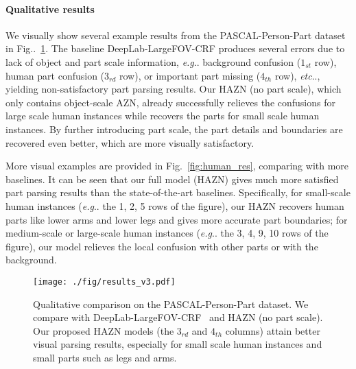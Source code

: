 \documentclass[runningheads]{llncs}
\makeatletter
\newcommand{\figref}[1]{Fig\onedot~\ref{#1}}
\DeclareRobustCommand\onedot{\futurelet\@let@token\@onedot}
\def\@onedot{\ifx\@let@token.\else.\null\fi\xspace}
\def\eg{\emph{e.g}\onedot} \def\Eg{\emph{E.g}\onedot}
\def\etc{\emph{etc}\onedot} \def\vs{\emph{vs}\onedot}
\makeatother
\begin{document}
\begin{table}[!b]
\centering
  \setlength{\tabcolsep}{10pt}
  \caption{Instance-wise part parsing accuracy on PASCAL-Person-Part in terms of $AP^r_{part}$.}
 \vspace{-1.\baselineskip}
  \label{table:apr_part}
\end{table}  

\paragraph{Qualitative results} We visually show several example results from the PASCAL-Person-Part dataset in \figref{fig:seg_image}. The baseline DeepLab-LargeFOV-CRF produces several errors due to lack of object and part scale information, \eg background confusion ($1_{st}$ row), human part confusion ($3_{rd}$ row), or important part missing ($4_{th}$ row), \etc, yielding non-satisfactory part parsing results. Our HAZN (no part scale), which only contains object-scale AZN, already successfully relieves the confusions for large scale human instances while recovers the parts for small scale human instances. By further introducing part scale, the part details and boundaries are recovered even better, which are more visually satisfactory.

More visual examples are provided in Fig.~\ref{fig:human_res}, comparing with more baselines. It can be seen that our full model (HAZN) gives much more satisfied part parsing results than the state-of-the-art baselines. Specifically, for small-scale human instances (\eg the 1, 2, 5 rows of the figure), our HAZN recovers human parts like lower arms and lower legs and gives more accurate part boundaries; for medium-scale or large-scale human instances (\eg the 3, 4, 9, 10 rows of the figure), our model relieves the local confusion with other parts or with the background.

\begin{figure} [t]
\vspace{-0.1\baselineskip}
\centering
\texttt{[image: ./fig/results\_v3.pdf]}
\vspace{-1.0\baselineskip}
\caption{Qualitative comparison on the PASCAL-Person-Part dataset. We compare with DeepLab-LargeFOV-CRF~\cite{chen2014semantic} and HAZN (no part scale). Our proposed HAZN models (the $3_{rd}$ and $4_{th}$ columns) attain better visual parsing results, especially for small scale human instances and small parts such as legs and arms.}
\vspace{-1.6\baselineskip}
\label{fig:seg_image}
\end{figure}
\end{document}

